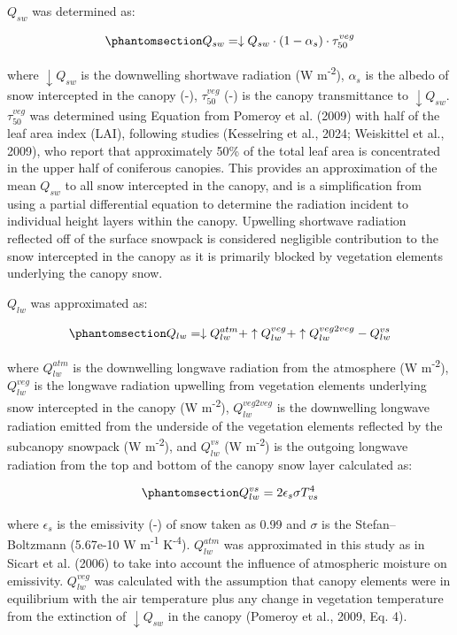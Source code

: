 \documentclass[
  letterpaper,
  DIV=11,
  numbers=noendperiod]{scrartcl}
\begin{document}
\(Q_{sw}\) was determined as:

\begin{equation}\phantomsection\label{eq-sw}{
Q_{sw} = \downarrow Q_{sw} \cdot (1 - \alpha_s) \cdot \tau_{50}^{veg}
}\end{equation}

where \(\downarrow Q_{sw}\) is the downwelling shortwave radiation (W
m\textsuperscript{-2}), \(\alpha_s\) is the albedo of snow intercepted
in the canopy (-), \(\tau_{50}^{veg}\) (-) is the canopy transmittance
to \(\downarrow Q_{sw}\). \(\tau_{50}^{veg}\) was determined using
Equation from Pomeroy et al. (2009) with half of the leaf area index
(LAI), following studies (Kesselring et al., 2024; Weiskittel et al.,
2009), who report that approximately 50\% of the total leaf area is
concentrated in the upper half of coniferous canopies. This provides an
approximation of the mean \(Q_{sw}\) to all snow intercepted in the
canopy, and is a simplification from using a partial differential
equation to determine the radiation incident to individual height layers
within the canopy. Upwelling shortwave radiation reflected off of the
surface snowpack is considered negligible contribution to the snow
intercepted in the canopy as it is primarily blocked by vegetation
elements underlying the canopy snow.

\(Q_{lw}\) was approximated as:

\begin{equation}\phantomsection\label{eq-lw}{
Q_{lw} = \downarrow Q_{lw}^{atm} + \uparrow Q_{lw}^{veg} + \uparrow Q_{lw}^{veg2veg} - Q_{lw}^{vs}
}\end{equation}

where \(Q_{lw}^{atm}\) is the downwelling longwave radiation from the
atmosphere (W m\textsuperscript{-2}), \(Q_{lw}^{veg}\) is the longwave
radiation upwelling from vegetation elements underlying snow intercepted
in the canopy (W m\textsuperscript{-2}), \(Q_{lw}^{veg2veg}\) is the
downwelling longwave radiation emitted from the underside of the
vegetation elements reflected by the subcanopy snowpack (W
m\textsuperscript{-2}), and \(Q_{lw}^{vs}\) (W m\textsuperscript{-2}) is
the outgoing longwave radiation from the top and bottom of the canopy
snow layer calculated as:

\begin{equation}\phantomsection\label{eq-lw-vs}{
Q_{lw}^{vs} = 2 \epsilon_{s} \sigma T_{vs}^4
}\end{equation}

where \(\epsilon_s\) is the emissivity (-) of snow taken as 0.99 and
\(\sigma\) is the Stefan--Boltzmann (5.67e-10 W m\textsuperscript{-1}
K\textsuperscript{-4}). \(Q_{lw}^{atm}\) was approximated in this study
as in Sicart et al. (2006) to take into account the influence of
atmospheric moisture on emissivity. \(Q_{lw}^{veg}\) was calculated with
the assumption that canopy elements were in equilibrium with the air
temperature plus any change in vegetation temperature from the
extinction of \(\downarrow Q_{sw}\) in the canopy (Pomeroy et al., 2009,
Eq. 4).
\end{document}
